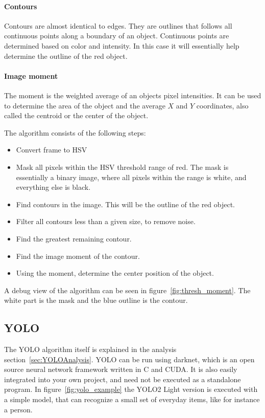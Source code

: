 \paragraph{Contours}
Contours are almost identical to edges.
They are outlines that follows all continuous points along a boundary of an object.
Continuous points are determined based on color and intensity.
In this case it will essentially help determine the outline of the red object.\cite{contours}

\paragraph{Image moment}
The moment is the weighted average of an objects pixel intensities.
It can be used to determine the area of the object and the average $X$ and $Y$ coordinates, also called the centroid or the center of the object.


The algorithm consists of the following steps:
\begin{itemize}
	\item Convert frame to HSV
	\item Mask all pixels within the HSV threshold range of red.
	The mask is essentially a binary image, where all pixels within the range is white, and everything else is black.
	\item Find contours in the image. 
	This will be the outline of the red object.
	\item Filter all contours less than a given size, to remove noise.
	\item Find the greatest remaining contour.
	\item Find the image moment of the contour.
	\item Using the moment, determine the center position of the object.
\end{itemize}

A debug view of the algorithm can be seen in figure~\ref{fig:thresh_moment}.
The white part is the mask and the blue outline is the contour.


\subsection{YOLO}

The YOLO algorithm itself is explained in the analysis section~\ref{sec:YOLOAnalysis}.
YOLO can be run using darknet, which is an open source neural network framework written in C and CUDA\cite{darknet13}.
It is also easily integrated into your own project, and need not be executed as a standalone program.
In figure~\ref{fig:yolo_example} the YOLO2 Light version is executed with a simple model, that can recognize a small set of everyday items, like for instance a person.

